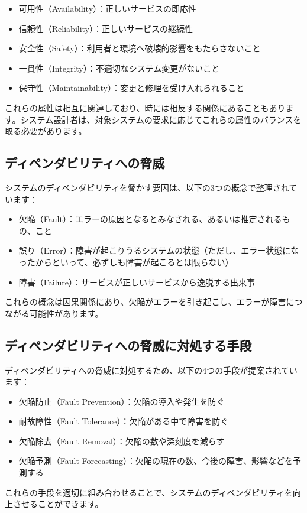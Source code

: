 \begin{itemize}
\item 可用性（Availability）：正しいサービスの即応性
\item 信頼性（Reliability）：正しいサービスの継続性
\item 安全性（Safety）：利用者と環境へ破壊的影響をもたらさないこと
\item 一貫性（Integrity）：不適切なシステム変更がないこと
\item 保守性（Maintainability）：変更と修理を受け入れられること
\end{itemize}

これらの属性は相互に関連しており、時には相反する関係にあることもあります。システム設計者は、対象システムの要求に応じてこれらの属性のバランスを取る必要があります。

\subsection{ディペンダビリティへの脅威}

システムのディペンダビリティを脅かす要因は、以下の3つの概念で整理されています：

\begin{itemize}
\item 欠陥（Fault）：エラーの原因となるとみなされる、あるいは推定されるもの、こと
\item 誤り（Error）：障害が起こりうるシステムの状態（ただし、エラー状態になったからといって、必ずしも障害が起こるとは限らない）
\item 障害（Failure）：サービスが正しいサービスから逸脱する出来事
\end{itemize}

これらの概念は因果関係にあり、欠陥がエラーを引き起こし、エラーが障害につながる可能性があります。

\subsection{ディペンダビリティへの脅威に対処する手段}

ディペンダビリティへの脅威に対処するため、以下の4つの手段が提案されています：
\begin{itemize}
\item 欠陥防止（Fault Prevention）：欠陥の導入や発生を防ぐ
\item 耐故障性（Fault Tolerance）：欠陥がある中で障害を防ぐ
\item 欠陥除去（Fault Removal）：欠陥の数や深刻度を減らす
\item 欠陥予測（Fault Forecasting）：欠陥の現在の数、今後の障害、影響などを予測する
\end{itemize}
これらの手段を適切に組み合わせることで、システムのディペンダビリティを向上させることができます。

